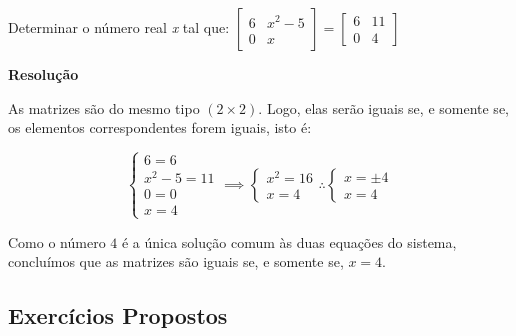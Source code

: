 \begin{exercise}
  Determinar o número real \textit{x} tal que: $\begin{bmatrix}
    6 & x^2-5 \\
    0 & x
  \end{bmatrix} = \begin{bmatrix}
    6 & 11 \\
    0 & 4
  \end{bmatrix}$

  \vspace{.3cm}
  \textbf{Resolução} \vspace{.3cm}

  As matrizes são do mesmo tipo $(2 \times 2)$. Logo, elas serão iguais se, e somente se, os elementos 
  correspondentes forem iguais, isto é:

  \begin{equation*}
    \begin{cases}
      6 = 6 \\
      x^2 - 5 = 11 \\
      0 = 0 \\
      x = 4
    \end{cases}
    \implies 
    \begin{cases}
      x^2 = 16 \\
      x = 4
    \end{cases}
    \therefore
    \begin{cases}
      x = \pm 4 \\
      x = 4
    \end{cases}
  \end{equation*}

  Como o número $4$ é a única solução comum às duas equações do sistema, concluímos que as matrizes são iguais se, e 
  somente se, $x = 4$.
  
\end{exercise}

\subsection{Exercícios Propostos}

